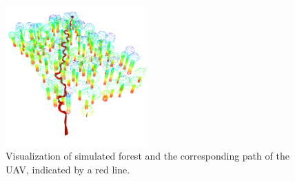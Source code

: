             \begin{figure}[H]
                \centering
                \includegraphics[width=0.48\textwidth]{./fig/rviz/simulation_forest.png}
                \caption{
                    Visualization of simulated forest and the corresponding path of the \ac{UAV}, indicated by a red line.
                }
                \label{fig:simulated_forest_path}
            \end{figure}

